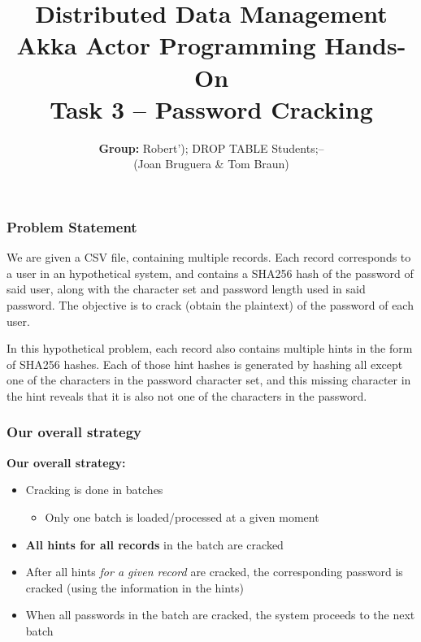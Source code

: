 \documentclass{beamer}
\begin{document}
\title{\normalsize{Distributed Data Management} \\
\normalsize{Akka Actor Programming Hands-On} \\
\huge{Task 3 – Password Cracking}}
\author{\textbf{Group:} Robert'); DROP TABLE Students;-- \\ (Joan Bruguera \& Tom Braun)} 
\date{} 

\begin{frame}
	\titlepage
\end{frame}

\begin{frame}
	\frametitle{Problem Statement}

	We are given a CSV file, containing multiple records. Each record corresponds to a user in an hypothetical system, and contains a SHA256 hash of the password of said user, along with the character set and password length used in said password. The objective is to crack (obtain the plaintext) of the password of each user. \vspace{5mm}

	In this hypothetical problem, each record also contains multiple hints in the form of SHA256 hashes. Each of those hint hashes is generated by hashing all except one of the characters in the password character set, and this missing character in the hint reveals that it is also not one of the characters in the password.

\end{frame}

\begin{frame}
	\frametitle{Our overall strategy}

	\textbf{Our overall strategy:}

	\begin{itemize}

		\item Cracking is done in batches

		\begin{itemize}

			\item Only one batch is loaded/processed at a given moment

		\end{itemize}

		\pause

		\item \textbf{All hints for all records} in the batch are cracked

		\pause

		\item After all hints \emph{for a given record} are cracked, the corresponding password is cracked (using the information in the hints)

		\pause

		\item When all passwords in the batch are cracked, the system proceeds to the next batch

	\end{itemize}
\end{frame}
\end{document}
